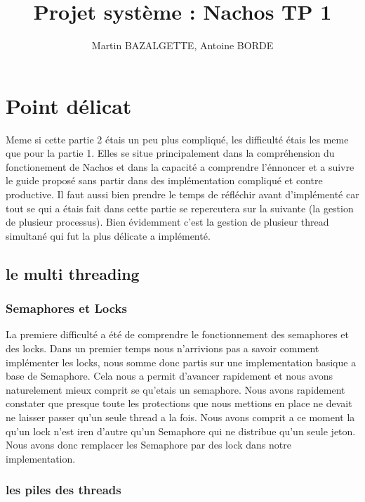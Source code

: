 \documentclass[10pt]{article}
\begin{document}
\title{Projet système : Nachos TP 1}
\author{Martin BAZALGETTE, Antoine BORDE}
\maketitle

\newpage
\tableofcontents
\newpage

\section {Point délicat}

Meme si cette partie 2 étais un peu plus compliqué, les difficulté étais les meme
que pour la partie 1. Elles se situe principalement dans la compréhension du fonctionement
de Nachos et dans la capacité a comprendre l'énnoncer et a suivre le guide proposé sans
partir dans des implémentation compliqué et contre productive. \newline Il faut aussi
bien prendre le temps de réfléchir avant d'implémenté car tout se qui a étais fait dans
cette partie se repercutera sur la suivante (la gestion de plusieur processus).
\newline
Bien évidemment c'est la gestion de plusieur thread simultané qui fut la plus délicate
a implémenté.

\subsection{le multi threading}
\subsubsection{Semaphores et Locks}
La premiere difficulté a été de comprendre le fonctionnement des semaphores et des locks.
Dans un premier temps nous n'arrivions pas a savoir comment implémenter les locks, nous somme
donc partis sur une implementation basique a base de Semaphore. Cela nous a permit d'avancer
rapidement et nous avons naturelement mieux comprit se qu'etais un semaphore.
\newline
Nous avons rapidement constater que presque toute les protections que nous mettions en place ne
devait ne laisser passer qu'un seule thread a la fois. Nous avons comprit a ce moment la qu'un
lock n'est iren d'autre qu'un Semaphore qui ne distribue qu'un seule jeton.
Nous avons donc remplacer les Semaphore par des lock dans notre implementation.

\subsubsection{les piles des threads}
\end{document}

